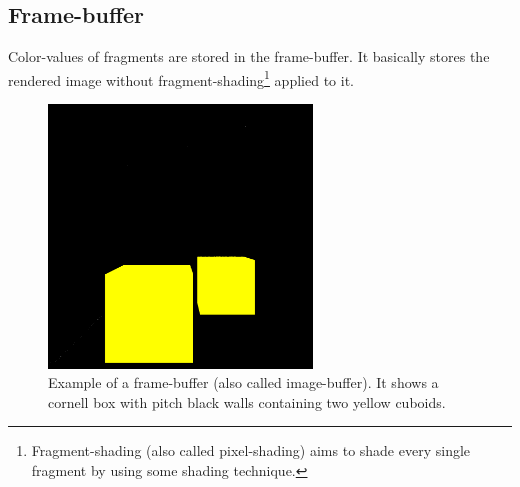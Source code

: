 \documentclass{ACGSeminar}
\begin{document}
	\subsection{Frame-buffer}%
		Color-values of fragments are stored in the frame-buffer. It basically stores the rendered image without fragment-shading\footnote{Fragment-shading (also called pixel-shading) aims to shade every single fragment by using some shading technique.} applied to it.%
		\begin{figure}[htb!]%
			\begin{center}%
				\includegraphics[width=7cm]{img/frame_buffer.png}
			\end{center}%
			\caption{Example of a frame-buffer (also called image-buffer). It shows a cornell box with pitch black walls containing two yellow cuboids.}%
			\label{fig:frame_buffer}
		\end{figure}%
\end{document}
